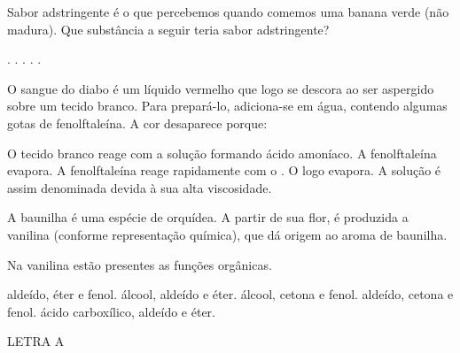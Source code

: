 \documentclass[11pt]{scrartcl}
\begin{document}
\begin{exercise}[points=1]
Sabor adstringente é o que percebemos quando comemos uma banana verde (não madura). Que substância a seguir teria sabor
adstringente?
\begin{choice}
\choice {}.
\choice {}.
\choice {}.
\choice {}.
\choice {}.
\end{choice}
\end{exercise}

\begin{exercise}[points=1]
O sangue do diabo é um líquido vermelho que logo se descora ao ser aspergido sobre um tecido branco. Para prepará-lo, adiciona-se  em água, contendo algumas gotas de fenolftaleína. A cor desaparece porque:

\begin{choice}
\choice O tecido branco reage com a solução formando ácido amoníaco.
\choice A fenolftaleína evapora.
\choice A fenolftaleína reage rapidamente com o .
\choice O  logo evapora.
\choice A solução é assim denominada devida à sua alta viscosidade.
\end{choice}
\end{exercise}






\begin{exercise}[points=1.0]
A baunilha é uma espécie de orquídea. A partir de sua flor, é produzida a vanilina (conforme representação química), que dá origem ao aroma de baunilha.

\begin{center}
\end{center}


Na vanilina estão presentes as funções orgânicas.

\begin{choice}
\choice aldeído, éter e fenol.
\choice álcool, aldeído e éter.
\choice álcool, cetona e fenol.
\choice aldeído, cetona e fenol.
\choice ácido carboxílico, aldeído e éter.
\end{choice}
\end{exercise}
\begin{solution}
LETRA A
\end{solution}
\end{document}
